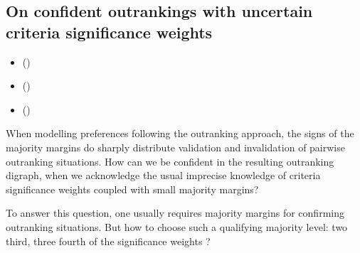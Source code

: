 \documentclass[a4paper,12pt,english]{sphinxhowto}
\begin{document}
\subsection{On confident outrankings with uncertain criteria significance weights}
\label{\detokenize{pearls:on-confident-outrankings-with-uncertain-criteria-significance-weights}}\label{\detokenize{pearls:bipolar-valued-likelihood-tutorial-label}}
\begin{sphinxcontents}
\begin{itemize}
\item {} 
\sphinxAtStartPar
{}\label{\detokenize{pearls:id140}}{\hyperref[\detokenize{pearls:modelling-uncertain-criteria-significance-weights}]{}} ()

\item {} 
\sphinxAtStartPar
{}\label{\detokenize{pearls:id141}}{\hyperref[\detokenize{pearls:bipolar-valued-likelihood-of-at-least-as-good-as-situations}]{}} ()

\item {} 
\sphinxAtStartPar
{}\label{\detokenize{pearls:id142}}{\hyperref[\detokenize{pearls:confidence-level-of-outranking-situations}]{}} ()

\end{itemize}
\end{sphinxcontents}

\sphinxAtStartPar
When modelling preferences following the outranking approach, the signs of the majority margins do sharply distribute validation and invalidation of pairwise outranking situations. How can we be confident in the resulting outranking digraph, when we acknowledge the usual imprecise knowledge of criteria significance weights coupled with small majority margins?

\sphinxAtStartPar
To answer this question, one usually requires  majority margins for confirming outranking situations. But how to choose such a qualifying majority level: two third, three fourth of the significance weights ?
\end{document}
